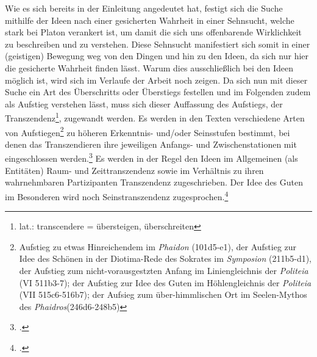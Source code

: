 Wie es sich bereits in der Einleitung angedeutet hat, festigt sich die Suche mithilfe der Ideen nach einer gesicherten Wahrheit in einer Sehnsucht, welche stark bei Platon verankert ist, um damit die sich uns offenbarende Wirklichkeit zu beschreiben und zu verstehen. Diese Sehnsucht manifestiert sich somit in einer (geistigen) Bewegung weg von den Dingen und hin zu den Ideen, da sich nur hier die gesicherte Wahrheit finden lässt. Warum dies ausschließlich bei den Ideen möglich ist, wird sich im Verlaufe der Arbeit noch zeigen. Da sich nun mit dieser Suche ein Art des Überschritts oder Überstiegs festellen und  im Folgenden zudem als Aufstieg verstehen lässt, muss sich dieser Auffassung des Aufstiegs, der Transzendenz\footnote{lat.: transcendere = übersteigen, überschreiten}, zugewandt werden.
Es werden in den Texten verschiedene Arten von Aufstiegen\footnote{Aufstieg zu etwas Hinreichendem im \emph{Phaidon} (101d5-e1), der Aufstieg zur Idee des Schönen in der Diotima-Rede des Sokrates im \emph{Symposion} (211b5-d1), der Aufstieg zum nicht-vorausgestzten Anfang im Liniengleichnis der \emph{Politeia} (VI 511b3-7); der Aufstieg zur Idee des Guten im Höhlengleichnis der \emph{Politeia} (VII 515c6-516b7); der Aufsieg zum über-himmlischen Ort im Seelen-Mythos des \emph{Phaidros}(246d6-248b5)} zu höheren Erkenntnis- und/oder Seinsstufen bestimmt, bei denen das Transzendieren ihre jeweiligen Anfangs- und Zwischenstationen mit eingeschlossen werden.\footcite[vgl.][S. 347]{StrobelTranszendenz}
Es werden in der Regel den Ideen im Allgemeinen (als Entitäten) Raum- und Zeittranszendenz sowie im Verhältnis zu ihren wahrnehmbaren Partizipanten Transzendenz zugeschrieben. Der Idee des Guten im Besonderen wird noch Seinstranszendenz zugesprochen.\footcite[vgl.][S. 347]{StrobelTranszendenz}\\
